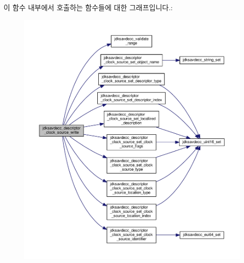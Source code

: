 이 함수 내부에서 호출하는 함수들에 대한 그래프입니다.\+:
\nopagebreak
\begin{figure}[H]
\begin{center}
\leavevmode
\includegraphics[width=350pt]{group__descriptor__clock__source_gaf3c785269953d9e38e4cfbf0bf45bfe6_cgraph}
\end{center}
\end{figure}


